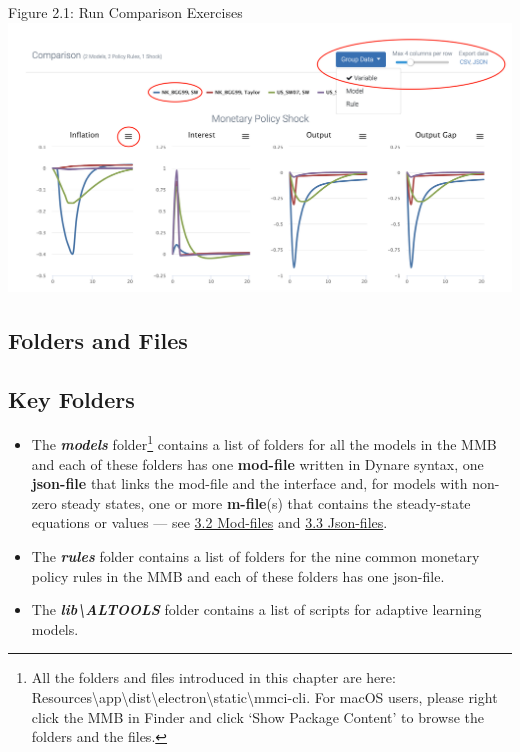 \documentclass[10pt,a4paper]{article}
\begin{document}
\begin{center}
Figure 2.1: Run Comparison Exercises\\
\medskip
\includegraphics[scale=0.35]{group}
\end{center}
\bigskip

\pagebreak








\begin{flushleft}
\section{Folders and Files}
\end{flushleft}
\medskip


\subsection{Key Folders}
\medskip

\begin{itemize}
\item The \textbf{\textit{models}} folder\footnote{All the folders and files introduced in this chapter are here: Resources\textbackslash app\textbackslash dist\textbackslash electron\textbackslash static\textbackslash mmci-cli. For macOS users, please right click the MMB in Finder and click ‘Show Package Content’ to browse the folders and the files.} contains a list of folders for all the models in the MMB and each of these folders has one \textbf{mod-file} written in Dynare syntax, one \textbf{json-file} that links the mod-file and the interface and, for models with non-zero steady states, one or more \textbf{m-file}(s) that contains the steady-state equations or values — see \hyperref[sec:Mod]{3.2 Mod-files} and \hyperref[sec:Json]{3.3 Json-files}. 

\item The \textbf{\textit{rules}} folder contains a list of folders for the nine common monetary policy rules in the MMB and each of these folders has one json-file. 

\item The \textbf{\textit{lib\textbackslash ALTOOLS}} folder contains a list of scripts for adaptive learning models.
\end{itemize}
\end{document}
